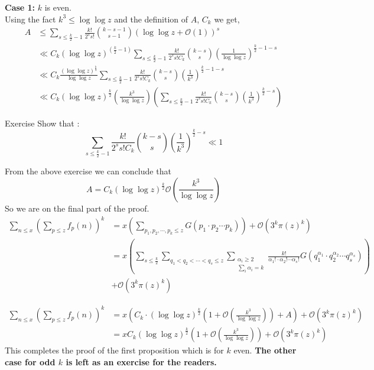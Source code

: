 \documentclass{beamer}
\numberwithin{theorem}{section}
\theoremstyle{definition}
\begin{document}
\begin{frame}{}
    \textbf{Case 1:} $k$ is even.\\
    Using the fact $k^3\le \log \log z$ and the definition of $A$, $C_k$ we get,
    \begin{align*}
        A&\le \sum_{s\le \frac{k}{2}-1}\frac{k!}{2^ss!}{k-s-1 \choose s-1}(\log \log z +\mathcal{O}(1))^s\\ &\ll C_k(\log \log z)^{(\frac{k}{2}-1)}\sum_{s\le \frac{k}{2}-1}\frac{k!}{2^ss!C_k}{k-s \choose s}\left(\frac{1}{\log\log z}\right)^{\frac{k}{2}-1-s}\\ &\ll C_k\frac{(\log\log z)^{\frac{k}{2}}}{\log\log z}\sum_{s\le \frac{k}{2}-1}\frac{k!}{2^ss!C_k}{k-s \choose s}\left(\frac{1}{k^3}\right)^{\frac{k}{2}-1-s}\\ &\ll C_k(\log\log z)^{\frac{k}{2}}\left(\frac{k^3}{\log\log z}\right)\left(\sum_{s\le \frac{k}{2}-1}\frac{k!}{2^ss!C_k}{k-s \choose s}\left(\frac{1}{k^3}\right)^{\frac{k}{2}-s}\right)
    \end{align*}
    
\end{frame}
\begin{frame}[shrink=20]
    \begin{block}{Exercise}
        Show that :
        $$\sum_{s\le \frac{k}{2}-1}\frac{k!}{2^ss!C_k}{k-s \choose s}\left(\frac{1}{k^3}\right)^{\frac{k}{2}-s}\ll1$$
    \end{block}
    From the above exercise we can conclude  that 
    $$A=C_k(\log\log z)^{\frac{k}{2}}\mathcal{O}\left(\frac{k^3}{\log\log z}\right)$$
    So we are on the final part of the proof.
    \begin{align*}
        \sum_{n\le x}\left(\sum_{p\le z}f_p(n)\right)^k&=x\left(\sum_{p_1,p_2,\cdots,p_k\le z}G(p_1\cdot p_2\cdots p_k)\right)+\mathcal{O}(3^k\pi(z)^k)\\ &=x\left(\sum_{s\le\frac{k}{2}}\sum_{q_1<q_2<\cdots <q_s\le z}\sum\limits_{\substack{\alpha_i\ge 2 \\ \sum_{i}\alpha_i=k}}\frac{k!}{\alpha_1!\cdot \alpha_2!\cdots \alpha_s!}G(q_1^{\alpha_1}\cdot q_2^{\alpha_2}\cdots q_s^{\alpha_s})\right)\\&+\mathcal{O}(3^k\pi(z)^k)
        \end{align*}
\end{frame}
\begin{frame}[shrink=10]
\begin{align*}
    \sum_{n\le x}\left(\sum_{p\le z}f_p(n)\right)^k&=x\left(C_k\cdot (\log\log z)^{\frac{k}{2}}\left(1+\mathcal{O}\left(\frac{k^3}{\log\log z}\right)\right)+A\right)+\mathcal{O}(3^k\pi(z)^k)\\&=xC_k (\log\log z)^{\frac{k}{2}}\left(1+\mathcal{O}\left(\frac{k^3}{\log\log z}\right)\right)+\mathcal{O}(3^k\pi(z)^k)
\end{align*}
    This completes the proof of the first proposition which is for $k$ even.
    \textbf{The other case for odd $k$ is left as an exercise for the readers.}
\end{frame}
\end{document}
